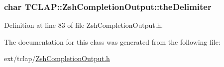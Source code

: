 \hypertarget{class_t_c_l_a_p_1_1_zsh_completion_output_a170dd4ecb233984f3e2b6f853c82b1b0}{}
\subsubsection[{the\+Delimiter}]{\setlength{\rightskip}{0pt plus 5cm}char T\+C\+L\+A\+P\+::\+Zsh\+Completion\+Output\+::the\+Delimiter\hspace{0.3cm}{\ttfamily [protected]}}\label{class_t_c_l_a_p_1_1_zsh_completion_output_a170dd4ecb233984f3e2b6f853c82b1b0}


Definition at line 83 of file Zsh\+Completion\+Output.\+h.



The documentation for this class was generated from the following file\+:\begin{DoxyCompactItemize}
\item 
ext/tclap/\hyperlink{_zsh_completion_output_8h}{Zsh\+Completion\+Output.\+h}\end{DoxyCompactItemize}
